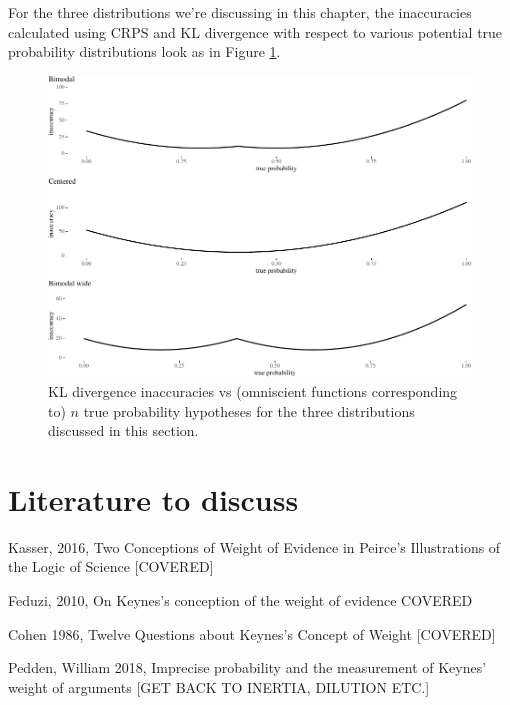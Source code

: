 \documentclass[
  10pt,
  dvipsnames,enabledeprecatedfontcommands]{scrartcl}
\begin{document}
For the three distributions we're discussing in this chapter, the
inaccuracies calculated using CRPS and KL divergence with respect to
various potential true probability distributions look as in Figure
\ref{fig:inaccuracies2}.

\begin{figure}[H]

\begin{center}\includegraphics[width=1\linewidth]{imprecision_weight_files/figure-latex/fig:inaccuracies2-1} \end{center}
\caption{KL divergence inaccuracies vs (omniscient functions corresponding to) $n$ true probability hypotheses for the three distributions discussed in this section.}
\label{fig:inaccuracies2}
\end{figure}

\hypertarget{literature-to-discuss}{%
\section{Literature to discuss}\label{literature-to-discuss}}

Kasser, 2016, Two Conceptions of Weight of Evidence in Peirce's
Illustrations of the Logic of Science {[}COVERED{]}

Feduzi, 2010, On Keynes's conception of the weight of evidence COVERED

Cohen 1986, Twelve Questions about Keynes's Concept of Weight
{[}COVERED{]}

Pedden, William 2018, Imprecise probability and the measurement of
Keynes' weight of arguments {[}GET BACK TO INERTIA, DILUTION ETC.{]}
\end{document}
